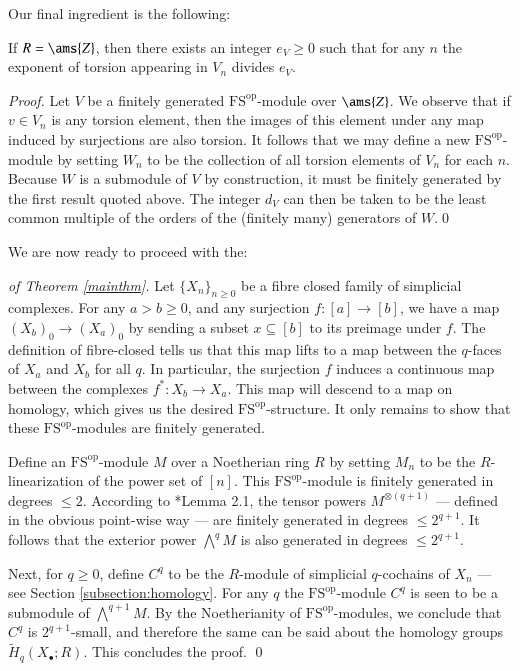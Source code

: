 \documentclass[matann2]{svjour1}
\newcommand{\FSop}{\operatorname{FS^{op}}}
\def\Z{\ams{Z}}
\begin{document}
Our final ingredient is the following:

\begin{proposition}
If $R = \Z$, then there exists an integer
$e_V \geq 0$ such that for any $n$ the exponent of
torsion appearing in $V_n$ divides $e_V$.
\end{proposition}

\begin{proof}
Let $V$ be a finitely generated $\FSop$-module over $\Z$.
We observe that if $v \in V_n$ is any torsion element,
then the images of this element under any
map induced by surjections are also torsion.
It follows that we may define a
new $\FSop$-module by setting $W_n$ to be the collection of
all torsion elements of $V_n$ for each $n$.
Because $W$ is a submodule of $V$ by construction,
it must be finitely generated by the first result quoted above. 
The integer $d_V$ can then be taken to be
the least common multiple of the orders of the (finitely many)
generators of $W$.\qed
\end{proof}

We are now ready to proceed with the:

\begin{proof}[of Theorem \ref{mainthm}]
Let $\{X_n\}_{n \geq 0}$
be a fibre closed family of simplicial complexes.
For any $a > b \geq 0$, and any surjection $f:[a] \rightarrow [b]$,
we have a map $(X_b)_0 \rightarrow (X_a)_0$ by sending
a subset 
$x\subseteq [b]$ to its preimage under $f$.
The definition of fibre-closed tells us that this map lifts
to a map between the $q$-faces of $X_a$ and $X_b$ for all $q$.
In particular, the surjection $f$ induces a continuous map
between the complexes $f^\ast:X_b \rightarrow X_a$.
This map will descend to a map on homology, which gives us
the desired $\FSop$-structure. It only remains to show that
these $\FSop$-modules are finitely generated.

Define an $\FSop$-module $M$ over a Noetherian ring $R$ by
setting $M_n$ to be the $R$-linearization
of the power set of $[n]$. This $\FSop$-module is finitely
generated in degrees $\leq 2$. According to
\cite{PR-resonance}*{Lemma 2.1}, the tensor powers
$M^{\otimes (q+1)}$ --- defined in the obvious point-wise way
--- are finitely generated in degrees $\leq 2^{q+1}$.
It follows that the exterior power $\bigwedge^q M$ is also
generated in degrees $\leq 2^{q+1}$.

Next, for $q \geq 0$, define $C^{q}$ to be the $R$-module of
simplicial $q$-cochains of $X_n$ --- see
Section \ref{subsection:homology}.
For any $q$ the $\FSop$-module
$C^q$ is seen to be a submodule of $\bigwedge^{q+1} M$.
By the Noetherianity of $\FSop$-modules,
we conclude that $C^q$ is $2^{q+1}$-small, and therefore
the same can be said about the homology groups 
$\widetilde{H}_q(X_\bullet;R)$.
This concludes the proof.
  \qed
\end{proof}
\end{document}
